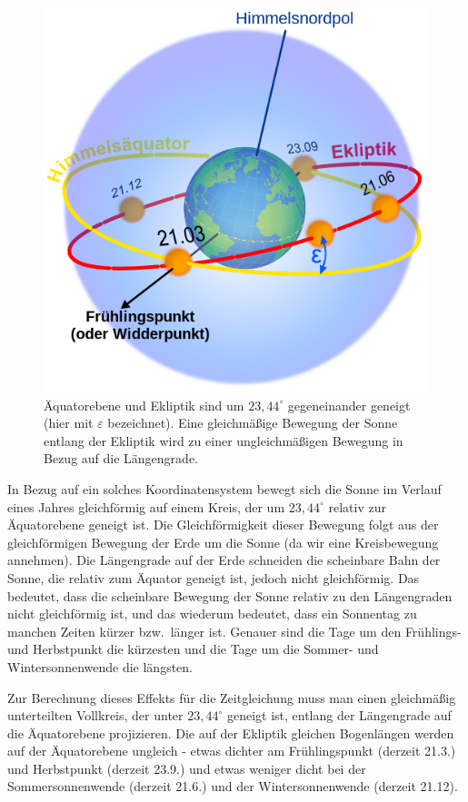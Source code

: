 \begin{figure}
\includegraphics[scale=0.3]{./Bilder/Ecliptic.png}
\caption{\label{fig_Ekliptik}%
\"Aquatorebene und Ekliptik sind um $23,44^\circ$ gegeneinander geneigt (hier mit
$\varepsilon$ bezeichnet). Eine
gleichm\"a\ss ige Bewegung der Sonne entlang der Ekliptik wird zu einer
ungleichm\"a\ss igen Bewegung in Bezug auf die L\"angengrade.} 
\end{figure}

In Bezug auf ein solches Koordinatensystem bewegt sich die Sonne im Verlauf eines Jahres
gleichf\"ormig auf einem Kreis, der um $23,44^\circ$ relativ zur \"Aquatorebene geneigt ist. 
Die Gleichf\"ormigkeit dieser Bewegung folgt aus der gleichf\"ormigen Bewegung der Erde um
die Sonne (da wir eine Kreisbewegung annehmen). Die L\"angengrade auf der Erde schneiden
die scheinbare Bahn der Sonne, die relativ zum \"Aquator geneigt ist, jedoch nicht gleichf\"ormig.
Das bedeutet, dass die scheinbare Bewegung der Sonne relativ zu den L\"angengraden
nicht gleichf\"ormig ist, und das wiederum bedeutet, dass ein Sonnentag zu manchen Zeiten
k\"urzer bzw.\ l\"anger ist. Genauer sind die Tage um den Fr\"uhlings- und Herbstpunkt die
k\"urzesten und die Tage um die Sommer- und Wintersonnenwende die l\"angsten.  
 
Zur Berechnung dieses Effekts f\"ur die Zeitgleichung 
muss man einen gleichm\"a\ss ig unterteilten Vollkreis, der unter $23,44^\circ$ geneigt ist,
entlang der L\"angengrade auf die \"Aquatorebene projizieren. 
Die auf der Ekliptik gleichen
Bogenl\"angen werden auf der \"Aquatorebene ungleich - etwas dichter am Fr\"uhlingspunkt (derzeit
21.3.) und Herbstpunkt (derzeit 23.9.) und etwas weniger dicht bei der Sommersonnenwende
(derzeit 21.6.) und der Wintersonnenwende 
(derzeit 21.12).      
   

